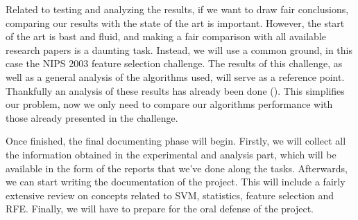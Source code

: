 Related to testing and analyzing the results, if we want to draw fair conclusions, comparing our results with the state of the art is important. However, the start of the art is bast and fluid, and making a fair comparison with all available research papers is a daunting task. Instead, we will use a common ground, in this case the NIPS 2003 feature selection challenge. The results of this challenge, as well as a general analysis of the algorithms used, will serve as a reference point. Thankfully an analysis of these results has already been done (\cite{guyon_result_2004}). This simplifies our problem, now we only need to compare our algorithms per\-for\-mance with those already pre\-sent\-ed in the challenge.

Once finished, the final documenting phase will begin. Firstly, we will collect all the information obtained in the experimental and analysis part, which will be available in the form of the reports that we've done along the tasks. Afterwards, we can start writing the documentation of the project. This will include a fairly extensive review on concepts related to SVM, statistics, feature selection and RFE. Finally, we will have to prepare for the oral defense of the project.

